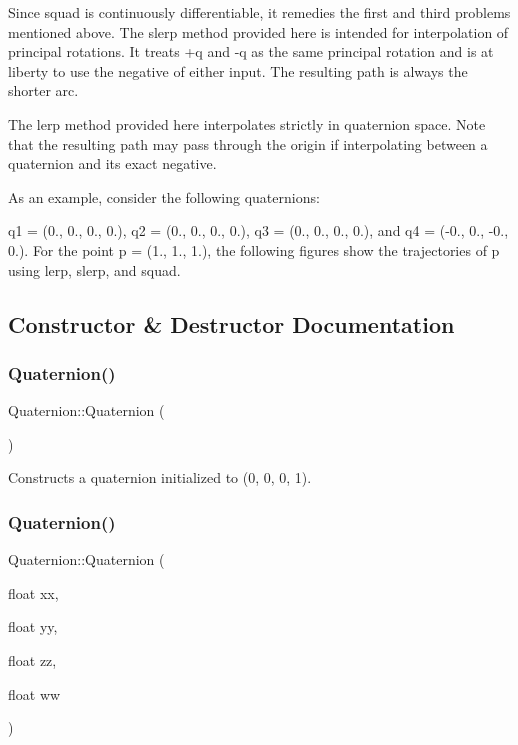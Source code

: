 Since squad is continuously differentiable, it remedies the first and third problems mentioned above. The slerp method provided here is intended for interpolation of principal rotations. It treats +q and -\/q as the same principal rotation and is at liberty to use the negative of either input. The resulting path is always the shorter arc.

The lerp method provided here interpolates strictly in quaternion space. Note that the resulting path may pass through the origin if interpolating between a quaternion and its exact negative.

As an example, consider the following quaternions\+:

q1 = (0., 0., 0., 0.), q2 = (0., 0., 0., 0.), q3 = (0., 0., 0., 0.), and q4 = (-\/0., 0., -\/0., 0.). For the point p = (1., 1., 1.), the following figures show the trajectories of p using lerp, slerp, and squad. 

\subsection{Constructor \& Destructor Documentation}
\mbox{\label{classQuaternion_abcc01358aada56ea5f0db4da18aaf77d}} 
\subsubsection{\texorpdfstring{Quaternion()}{Quaternion()}\hspace{0.1cm}{\footnotesize\ttfamily [1/12]}}
{\footnotesize\ttfamily Quaternion\+::\+Quaternion (\begin{DoxyParamCaption}{ }\end{DoxyParamCaption})}

Constructs a quaternion initialized to (0, 0, 0, 1). \mbox{\label{classQuaternion_a4dcf5b1a3c937b45a0d38ccd4ad6945f}} 
\subsubsection{\texorpdfstring{Quaternion()}{Quaternion()}\hspace{0.1cm}{\footnotesize\ttfamily [2/12]}}
{\footnotesize\ttfamily Quaternion\+::\+Quaternion (\begin{DoxyParamCaption}\item[{float}]{xx,  }\item[{float}]{yy,  }\item[{float}]{zz,  }\item[{float}]{ww }\end{DoxyParamCaption})}

